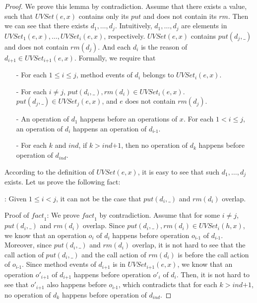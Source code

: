 \begin {proof}

We prove this lemma by contradiction. Assume that there exists a value, such that $\textit{UVSet}(e,x)$ contains only its $\textit{put}$ and does not contain its $\textit{rm}$. Then we can see that there exists $d_1,\ldots,d_j$. Intuitively, $d_1,\ldots,d_j$ are elements in $\textit{UVSet}_1(e,x), \ldots, \textit{UVSet}_i(e,x)$, respectively. $\textit{UVSet}(e,x)$ contains $\textit{put}(d_j,\_)$ and does not contain $\textit{rm}(d_j)$. And each $d_i$ is the reason of $d_{\textit{i+1}} \in \textit{UVSet}_{\textit{i+1}}(e,x)$. Formally, we require that

\begin{itemize}
\setlength{\itemsep}{0.5pt}
\item[-] For each $1 \leq i \leq j$, method events of $d_i$ belongs to $\textit{UVSet}_i(e,x)$.

\item[-] For each $i \neq j$, $\textit{put}(d_i,\_),\textit{rm}(d_i) \in \textit{UVSet}_i(e,x)$. $\textit{put}(d_j,\_) \in \textit{UVSet}_j(e,x)$, and $e$ does not contain $\textit{rm}(d_j)$.

\item[-] An operation of $d_1$ happens before an operations of $x$. For each $1 < i \leq j$, an operation of $d_i$ happens an operation of $d_{\textit{i-1}}$.

\item[-] For each $k$ and $\textit{ind}$, if $k > \textit{ind+1}$, then no operation of $d_k$ happens before operation of $d_{\textit{ind}}$.
\end{itemize}

According to the definition of $\textit{UVSet}(e,x)$, it is easy to see that such $d_1,\ldots,d_j$ exists. Let us prove the following fact:

: Given $1 \leq i < j$, it can not be the case that $\textit{put}(d_i,\_)$ and $\textit{rm}(d_i)$ overlap.

Proof of $\textit{fact}_1$: We prove $\textit{fact}_1$ by contradiction. Assume that for some $i \neq j$, $\textit{put}(d_i,\_)$ and $\textit{rm}(d_i)$ overlap. Since $\textit{put}(d_i,\_), \textit{rm}(d_i) \in \textit{UVSet}_i(h,x)$, we know that an operation $o_i$ of $d_i$ happens before operation $o_{\textit{i-1}}$ of $d_{\textit{i-1}}$. Moreover, since $\textit{put}(d_i,\_)$ and $\textit{rm}(d_i)$ overlap, it is not hard to see that the call action of $\textit{put}(d_i,\_)$ and the call action of $\textit{rm}(d_i)$ is before the call action of $o_{\textit{i-1}}$. Since method events of $d_{\textit{i+1}}$ is in $\textit{UVSet}_{\textit{i+1}}(e,x)$, we know that an operation $o'_{\textit{i+1}}$ of $d_{\textit{i+1}}$ happens before operation $o'_i$ of $d_i$. Then, it is not hard to see that $o'_{\textit{i+1}}$ also happens before $o_{\textit{i-1}}$, which contradicts that for each $k > \textit{ind+1}$, no operation of $d_k$ happens before operation of $d_{\textit{ind}}$.


\end{proof}
